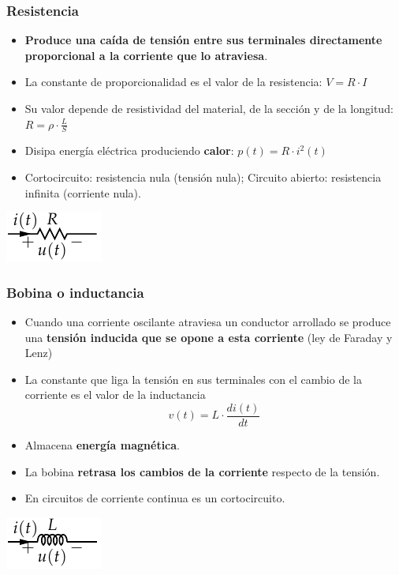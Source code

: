 \documentclass[serif, xcolor=dvipsnames]{beamer}
\begin{document}
\begin{frame}
  \frametitle{Resistencia}
  \begin{itemize}
  \item \textbf{Produce una caída de tensión entre sus terminales
      directamente proporcional a la corriente que lo atraviesa}.
  \item La constante de proporcionalidad es el valor de la
    resistencia: $V=R\cdot I$
  \item Su valor depende de resistividad del material, de la sección y
    de la longitud: $R=\rho\cdot\frac{L}{S}$
  \item Disipa energía eléctrica produciendo \textbf{calor}:
    $p(t)=R\cdot i^{2}(t)$
  \item Cortocircuito: resistencia nula (tensión nula); Circuito
    abierto: resistencia infinita (corriente nula).
  \end{itemize}
  \begin{center}
    \includegraphics{../figs/Resistencia}
    \par\end{center}


\end{frame}
\begin{frame}
  \frametitle{Bobina o inductancia}
  \begin{itemize}
  \item Cuando una corriente oscilante atraviesa un conductor
    arrollado se produce una \textbf{tensión inducida que se opone a
      esta corriente} (ley de Faraday y Lenz)
  \item La constante que liga la tensión en sus terminales con el
    cambio de la corriente es el valor de la inductancia
    \[
    v(t)=L\cdot\frac{di(t)}{dt}
    \]

  \item Almacena \textbf{energía magnética}.
  \item La bobina \textbf{retrasa los cambios de la corriente}
    respecto de la tensión.
  \item En circuitos de corriente continua es un cortocircuito.
  \end{itemize}
  \begin{center}
    \includegraphics{../figs/Bobina}
    \par\end{center}


\end{frame}
\end{document}
